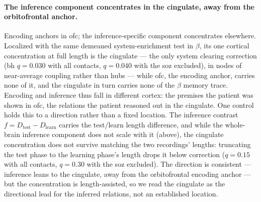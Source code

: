 \paragraph{The inference component concentrates in the cingulate, away from the orbitofrontal anchor.}
Encoding anchors in \gls{ofc}; the inference-specific component concentrates elsewhere. Localized with the same demeaned system-enrichment test in \(\beta\), its one cortical concentration at full length is the cingulate --- the only system clearing correction (\gls{bh} \(q = 0.030\) with all contacts, \(q = 0.040\) with the \gls{soz} excluded), in nodes of near-average coupling rather than hubs --- while \gls{ofc}, the encoding anchor, carries none of it, and the cingulate in turn carries none of the \(\beta\) memory trace. Encoding and inference thus fall in different cortex: the premises the patient was shown in \gls{ofc}, the relations the patient reasoned out in the cingulate. One control holds this to a direction rather than a fixed location. The inference contrast \(f = D_{\mathrm{test}} - D_{\mathrm{learn}}\) carries the test/learn length difference, and while the whole-brain inference component does not scale with it (above), the cingulate concentration does not survive matching the two recordings' lengths: truncating the test phase to the learning phase's length drops it below correction (\(q = 0.15\) with all contacts, \(q = 0.30\) with the \gls{soz} excluded). The direction is consistent --- inference leans to the cingulate, away from the orbitofrontal encoding anchor --- but the concentration is length-assisted, so we read the cingulate as the directional lead for the inferred relations, not an established location.
